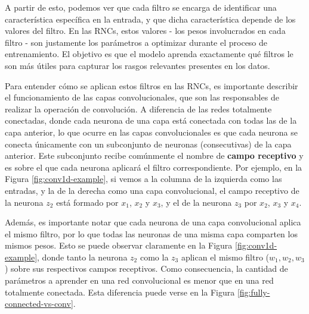 \documentclass[../../main.tex]{subfiles}
\begin{document}
A partir de esto, podemos ver que cada filtro se encarga de identificar una característica
específica en la entrada, y que dicha característica depende de los valores del filtro. En
las RNCs, estos valores - los pesos involucrados en cada filtro - son justamente los
parámetros a optimizar durante el proceso de entrenamiento. El objetivo es que el modelo
aprenda exactamente qué filtros le son más útiles para capturar los rasgos relevantes
presentes en los datos.

Para entender cómo se aplican estos filtros en las RNCs, es importante describir el
funcionamiento de las capas convolucionales, que son las responsables de realizar la
operación de convolución. A diferencia de las redes totalmente conectadas, donde cada
neurona de una capa está conectada con todas las de la capa anterior, lo que ocurre en las
capas convolucionales es que cada neurona se conecta únicamente con un subconjunto de
neuronas (consecutivas) de la capa anterior. Este subconjunto recibe comúnmente el nombre
de \textbf{campo receptivo} y es sobre el que cada neurona aplicará el filtro
correspondiente. Por ejemplo, en la Figura \ref{fig:conv1d-example}, si vemos a la columna
de la izquierda como las entradas, y la de la derecha como una capa convolucional, el
campo receptivo de la neurona \(z_2\) está formado por \(x_1\), \(x_2\) y \(x_3\), y el de
la neurona \(z_3\) por \(x_2\), \(x_3\) y \(x_4\).

Además, es importante notar que cada neurona de una capa convolucional aplica el mismo
filtro, por lo que todas las neuronas de una misma capa comparten los mismos pesos. Esto
se puede observar claramente en la Figura \ref{fig:conv1d-example}, donde tanto la neurona
\(z_2\) como la \(z_3\) aplican el mismo filtro (\(w_1, w_2, w_3\)) sobre sus respectivos
campos receptivos. Como consecuencia, la cantidad de parámetros a aprender en una red
convolucional es menor que en una red totalmente conectada. Esta diferencia puede verse en
la Figura \ref{fig:fully-connected-vs-conv}.
\end{document}
